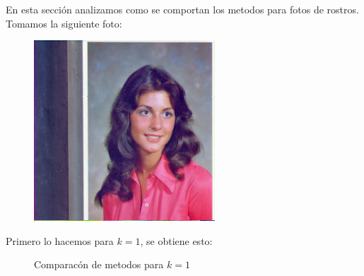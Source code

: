 En esta sección analizamos como se comportan los metodos para fotos de rostros. Tomamos la siguiente foto:

\begin{figure}[H]
\centering
\includegraphics[scale=0.50]{fotos/rostro/orig.png}
\end{figure}

Primero lo hacemos para $k=1$, se obtiene esto:

\begin{figure}[H]
    \centering
    \qquad
    \qquad
    \caption{Comparacón de metodos para $k = 1$}%
    \label{fig:example}%
\end{figure}

